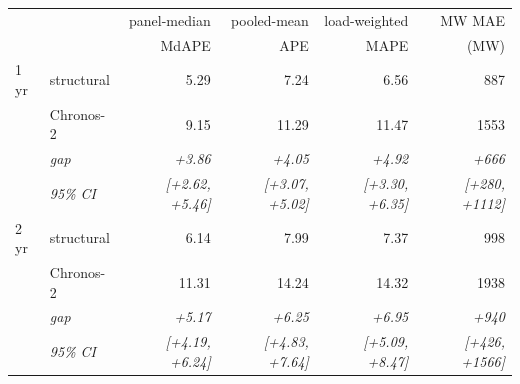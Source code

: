 \begin{tabular}{llrrrr}
\toprule
 & & panel-median & pooled-mean & load-weighted & MW MAE \\
 & & MdAPE & APE & MAPE & (MW) \\
\midrule
1\,yr & structural & 5.29 & 7.24 & 6.56 & 887 \\
 & Chronos-2 & 9.15 & 11.29 & 11.47 & 1553 \\
 & \emph{gap} & \emph{+3.86} & \emph{+4.05} & \emph{+4.92} & \emph{+666} \\
 & \emph{95\% CI} & \emph{[+2.62, +5.46]} & \emph{[+3.07, +5.02]} & \emph{[+3.30, +6.35]} & \emph{[+280, +1112]} \\
\midrule
2\,yr & structural & 6.14 & 7.99 & 7.37 & 998 \\
 & Chronos-2 & 11.31 & 14.24 & 14.32 & 1938 \\
 & \emph{gap} & \emph{+5.17} & \emph{+6.25} & \emph{+6.95} & \emph{+940} \\
 & \emph{95\% CI} & \emph{[+4.19, +6.24]} & \emph{[+4.83, +7.64]} & \emph{[+5.09, +8.47]} & \emph{[+426, +1566]} \\
\bottomrule
\end{tabular}
